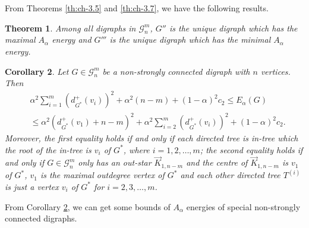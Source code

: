 \documentclass[11pt]{article}
\newtheorem{theorem}{Theorem}[section]
\newtheorem{corollary}[theorem]{Corollary}
\begin{document}
From Theorems \ref{th:ch-3.5} and \ref{th:ch-3.7}, we have the following results.

\noindent\begin{theorem}\label{th:ch-3.8} Among all digraphs in $\mathcal{G}_n^m$, $G''$ is the unique digraph which has the maximal $A_\alpha$ energy and $G'''$ is the unique digraph which has the minimal $A_\alpha$ energy.
\end{theorem}

\noindent\begin{corollary}\label{co:ch-3.9} Let $G\in\mathcal{G}_n^m$ be a non-strongly connected digraph with $n$ vertices. Then
\begin{align*}
&\alpha^2\sum_{i=1}^m(d_{G^*}^+(v_i))^2+\alpha^2(n-m)+(1-\alpha)^2c_2\leq E_\alpha(G)\\
&\leq\alpha^2\left(d_{G^*}^+(v_1)+n-m\right)^2+\alpha^2\sum_{i=2}^m(d_{G^*}^+(v_i))^2+(1-\alpha)^2c_2.
\end{align*}
Moreover, the first equality holds if and only if each directed tree is in-tree which the root of the in-tree is $v_i$ of $G^*$, where $i=1,2,\ldots,m$; the second equality holds if and only if $G\in\mathcal{G}_n^m$ only has an out-star $\stackrel{\rightarrow}{K}_{1,n-m}$ and the centre of $\stackrel{\rightarrow}{K}_{1,n-m}$ is $v_1$ of $G^*$, $v_1$ is the maximal outdegree vertex of $G^*$ and each other directed tree $T^{(i)}$ is just a vertex $v_i$ of $G^*$ for $i=2,3,\ldots,m$.
\end{corollary}

From Corollary \ref{co:ch-3.9}, we can get some bounds of $A_\alpha$ energies of special non-strongly connected digraphs.
\end{document}
